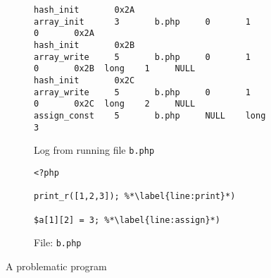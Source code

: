 


\begin{figure}[ht]
\centering
\begin{subfigure}{\textwidth}
\begin{lstlisting}[mathescape, deletekeywords={array},basicstyle=\tiny]
hash_init       0x2A
array_init      3       b.php     0       1       0       0x2A
hash_init       0x2B
array_write     5       b.php     0       1       0       0x2B  long    1     NULL
hash_init       0x2C
array_write     5       b.php     0       1       0       0x2C  long    2     NULL
assign_const    5       b.php     NULL    long    3
\end{lstlisting}
\caption{Log from running file \texttt{b.php}}
\label{lst:dis_code_out}
\end{subfigure}
\begin{subfigure}{\textwidth}
\begin{lstlisting}
<?php

print_r([1,2,3]); %*\label{line:print}*)

$a[1][2] = 3; %*\label{line:assign}*)

\end{lstlisting}
\caption{File: \texttt{b.php}}
\label{lst:dis_code}
\end{subfigure}
\caption{A problematic program}
\label{lst:dis}
\end{figure}